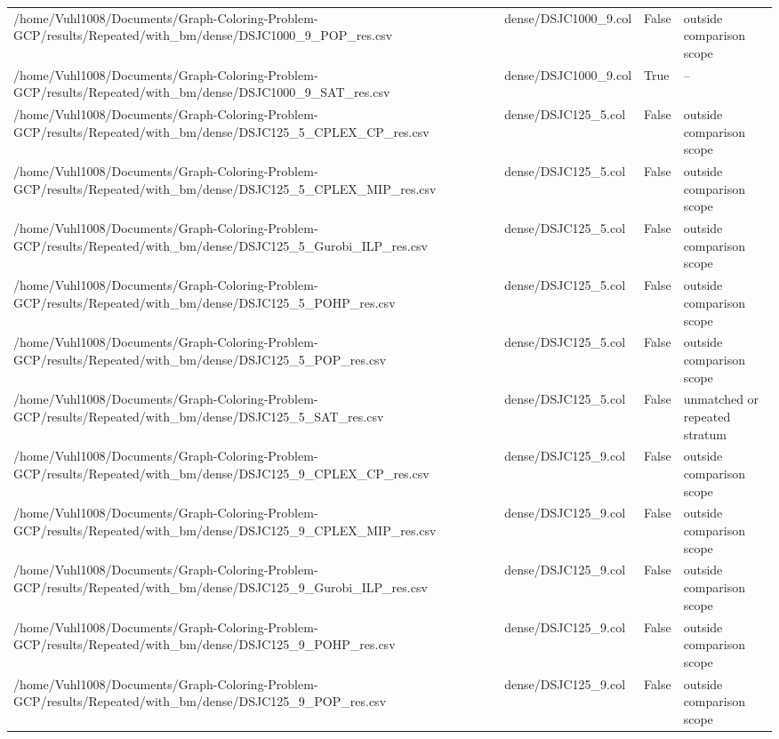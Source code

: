 \begin{table}[htbp]
\begin{tabular}{llll}
/home/Vuhl1008/Documents/Graph-Coloring-Problem-GCP/results/Repeated/with\_bm/dense/DSJC1000\_9\_POP\_res.csv & dense/DSJC1000\_9.col & False & outside comparison scope \\
/home/Vuhl1008/Documents/Graph-Coloring-Problem-GCP/results/Repeated/with\_bm/dense/DSJC1000\_9\_SAT\_res.csv & dense/DSJC1000\_9.col & True & -- \\
/home/Vuhl1008/Documents/Graph-Coloring-Problem-GCP/results/Repeated/with\_bm/dense/DSJC125\_5\_CPLEX\_CP\_res.csv & dense/DSJC125\_5.col & False & outside comparison scope \\
/home/Vuhl1008/Documents/Graph-Coloring-Problem-GCP/results/Repeated/with\_bm/dense/DSJC125\_5\_CPLEX\_MIP\_res.csv & dense/DSJC125\_5.col & False & outside comparison scope \\
/home/Vuhl1008/Documents/Graph-Coloring-Problem-GCP/results/Repeated/with\_bm/dense/DSJC125\_5\_Gurobi\_ILP\_res.csv & dense/DSJC125\_5.col & False & outside comparison scope \\
/home/Vuhl1008/Documents/Graph-Coloring-Problem-GCP/results/Repeated/with\_bm/dense/DSJC125\_5\_POHP\_res.csv & dense/DSJC125\_5.col & False & outside comparison scope \\
/home/Vuhl1008/Documents/Graph-Coloring-Problem-GCP/results/Repeated/with\_bm/dense/DSJC125\_5\_POP\_res.csv & dense/DSJC125\_5.col & False & outside comparison scope \\
/home/Vuhl1008/Documents/Graph-Coloring-Problem-GCP/results/Repeated/with\_bm/dense/DSJC125\_5\_SAT\_res.csv & dense/DSJC125\_5.col & False & unmatched or repeated stratum \\
/home/Vuhl1008/Documents/Graph-Coloring-Problem-GCP/results/Repeated/with\_bm/dense/DSJC125\_9\_CPLEX\_CP\_res.csv & dense/DSJC125\_9.col & False & outside comparison scope \\
/home/Vuhl1008/Documents/Graph-Coloring-Problem-GCP/results/Repeated/with\_bm/dense/DSJC125\_9\_CPLEX\_MIP\_res.csv & dense/DSJC125\_9.col & False & outside comparison scope \\
/home/Vuhl1008/Documents/Graph-Coloring-Problem-GCP/results/Repeated/with\_bm/dense/DSJC125\_9\_Gurobi\_ILP\_res.csv & dense/DSJC125\_9.col & False & outside comparison scope \\
/home/Vuhl1008/Documents/Graph-Coloring-Problem-GCP/results/Repeated/with\_bm/dense/DSJC125\_9\_POHP\_res.csv & dense/DSJC125\_9.col & False & outside comparison scope \\
/home/Vuhl1008/Documents/Graph-Coloring-Problem-GCP/results/Repeated/with\_bm/dense/DSJC125\_9\_POP\_res.csv & dense/DSJC125\_9.col & False & outside comparison scope \\

\end{tabular}
\end{table}
